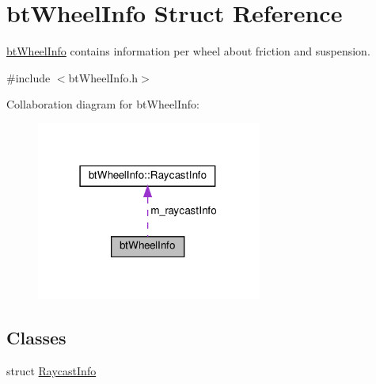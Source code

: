 \hypertarget{structbtWheelInfo}{}\section{bt\+Wheel\+Info Struct Reference}
\label{structbtWheelInfo}


\hyperlink{structbtWheelInfo}{bt\+Wheel\+Info} contains information per wheel about friction and suspension.  




{\ttfamily \#include $<$bt\+Wheel\+Info.\+h$>$}



Collaboration diagram for bt\+Wheel\+Info\+:
\nopagebreak
\begin{figure}[H]
\begin{center}
\leavevmode
\includegraphics[width=210pt]{structbtWheelInfo__coll__graph}
\end{center}
\end{figure}
\subsection*{Classes}
\begin{DoxyCompactItemize}
\item 
struct \hyperlink{structbtWheelInfo_1_1RaycastInfo}{Raycast\+Info}
\end{DoxyCompactItemize}
